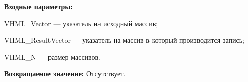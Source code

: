 \textbf{Входные параметры:}

 VHML\_Vector --- указатель на исходный массив;
 
 VHML\_ResultVector --- указатель на массив в который производится запись;
 
 VHML\_N --- размер массивов.

\textbf{Возвращаемое значение:}
Отсутствует.